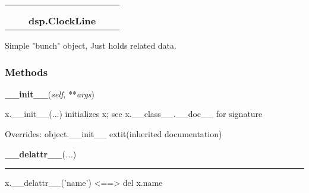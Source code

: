     \label{dsp:ClockLine}
\begin{tabular}{cccccc}
\multicolumn{2}{r}{\settowidth{\BCL}{object}\multirow{2}{\BCL}{object}}
&&
  \\\cline{3-3}
  &&\multicolumn{1}{c|}{}
&&
  \\
&&\multicolumn{2}{l}{\textbf{dsp.ClockLine}}
\end{tabular}

Simple "bunch" object, Just holds related data.



  \subsubsection{Methods}

    \vspace{0.5ex}

    \begin{boxedminipage}{\textwidth}

    \raggedright \textbf{\_\_init\_\_}(\textit{self}, **\textit{args})

    x.\_\_init\_\_(...) initializes x; see x.\_\_class\_\_.\_\_doc\_\_ for 
    signature

    \vspace{1ex}

      Overrides: object.\_\_init\_\_ 	extit{(inherited documentation)}

    \end{boxedminipage}

    \label{object:__delattr__}

    \vspace{0.5ex}

    \begin{boxedminipage}{\textwidth}

    \raggedright \textbf{\_\_delattr\_\_}(\textit{...})

    \vspace{-1.5ex}

    \rule{\textwidth}{0.5\fboxrule}
    x.\_\_delattr\_\_('name') {\textless}=={\textgreater} del x.name

    \vspace{1ex}

    \end{boxedminipage}

